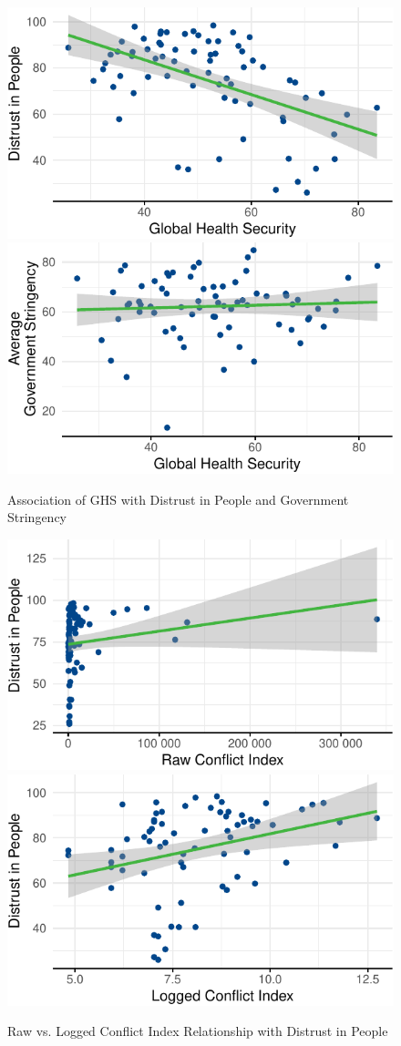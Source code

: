 \documentclass[
  12pt,
]{article}
\begin{document}
\begin{figure}
\includegraphics[width=0.48\linewidth]{write_up_test_files/figure-latex/ghs-plots-1} \includegraphics[width=0.48\linewidth]{write_up_test_files/figure-latex/ghs-plots-2} \caption{Association of GHS with Distrust in People and Government Stringency}\label{fig:ghs-plots}
\end{figure}

\begin{figure}
\includegraphics[width=0.48\linewidth]{write_up_test_files/figure-latex/conflict-log-1} \includegraphics[width=0.48\linewidth]{write_up_test_files/figure-latex/conflict-log-2} \caption{Raw vs. Logged Conflict Index Relationship with Distrust in People}\label{fig:conflict-log}
\end{figure}
\end{document}
